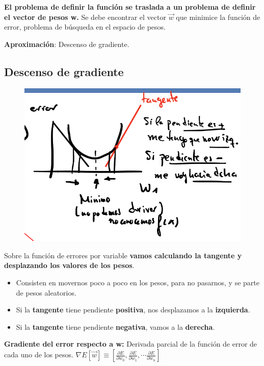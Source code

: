 \documentclass[12pt]{report} %
\begin{document}
\textbf{El problema de definir la función se traslada a un problema de
definir el vector de pesos w.} Se debe encontrar el vector \(\vec{w}\)
que minimice la función de error, problema de búsqueda en el espacio de
pesos.

\textbf{Aproximación}: Descenso de gradiente.

\subsection{Descenso de gradiente}
\begin{figure}[H]
	{\includegraphics[scale=.3]{image-20210305214445428.png}}
\end{figure}
Sobre la función de errores por variable \textbf{vamos calculando la
tangente y desplazando los valores de los pesos}.

\begin{itemize}

\item
  Consisten en movernos poco a poco en los pesos, para no pasarnos, y se
  parte de pesos aleatorios.
\item
  Si la \textbf{tangente} tiene pendiente \textbf{positiva}, nos
  desplazamos a la \textbf{izquierda}.
\item
  Si la \textbf{tangente} tiene pendiente \textbf{negativa}, vamos a la
  \textbf{derecha}.
\end{itemize}

\textbf{Gradiente del error respecto a w:} Derivada parcial de la
función de error de cada uno de los pesos.
\(\nabla E[\vec{w}] \equiv\left[\frac{\partial E}{\partial w_{0}}, \frac{\partial E}{\partial w_{1}}, \cdots \frac{\partial E}{\partial w_{n}}\right]\)
\end{document}
